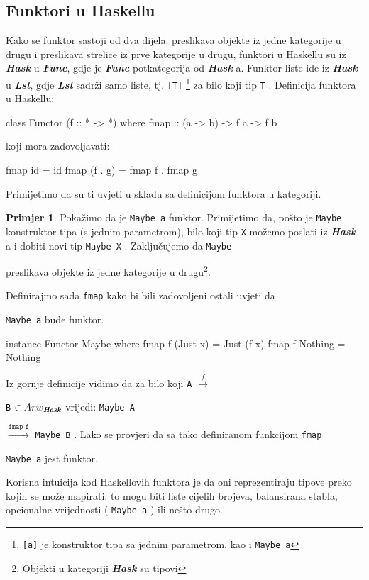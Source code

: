 \documentclass[11pt]{article}
\newcommand{\category}[1]{\textbf{\emph{#1}}}
\newcommand{\codei}[1]{
  {\lstinline[basicstyle=\ttfamily]{#1}}
}
\theoremstyle{definition}
\newtheorem{primjer}{Primjer}
\begin{document}
  \subsection{Funktori u Haskellu}
  Kako se funktor sastoji od dva dijela: preslikava objekte iz jedne kategorije u drugu
  i preslikava strelice iz prve kategorije u drugu, funktori u Haskellu su iz
  \category{Hask} u \category{Func}, gdje je \category{Func} potkategorija od
  \category{Hask}-a. Funktor liste ide iz \category{Hask} u \category{Lst},
  gdje \category{Lst} sadrži samo liste, tj.\codei{[T]}\footnote{
    \codei{[a]} je konstruktor tipa sa jednim parametrom,
    kao i \codei{Maybe a}}
  za bilo koji tip \codei{T}. Definicija funktora u Haskellu:
  \begin{mcode}
    class Functor (f :: * -> *) where
      fmap :: (a -> b) -> f a -> f b
  \end{mcode}
  koji mora zadovoljavati:
  \begin{mcode}
    fmap id = id
    fmap (f . g) = fmap f . fmap g
  \end{mcode}
  Primijetimo da su ti uvjeti u skladu sa definicijom funktora u kategoriji.
  \begin{primjer}
    Pokažimo da je \codei{Maybe a} funktor.
    Primijetimo da, pošto je \codei{Maybe} konstruktor tipa (s jednim
    parametrom), bilo koji tip \codei{X} možemo poslati iz \category{Hask}-a i
    dobiti novi tip \codei{Maybe X}. Zaključujemo da \codei{Maybe}
    preslikava objekte iz jedne kategorije u drugu\footnote{Objekti u
      kategoriji \category{Hask} su tipovi}.

    Definirajmo sada \codei{fmap} kako bi bili zadovoljeni ostali uvjeti da
    \codei{Maybe a} bude funktor.
    \begin{mcode}
      instance Functor Maybe where
        fmap f (Just x) = Just (f x)
        fmap f Nothing = Nothing
    \end{mcode}
    Iz gornje definicije vidimo da za bilo koji \codei{A} $\xrightarrow{f}$
    \codei{B} $\in
    Arw_\category{Hask}$ vrijedi: \codei{Maybe A}
    $\xrightarrow{\texttt{fmap f}}$ \codei{Maybe B}.
    Lako se provjeri da sa tako definiranom funkcijom \codei{fmap} 
    \codei{Maybe a} jest funktor.
  \end{primjer}
  Korisna intuicija kod Haskellovih funktora je da oni reprezentiraju tipove
  preko kojih se može mapirati: to mogu biti liste cijelih brojeva,
  balansirana stabla, opcionalne vrijednosti (\codei{Maybe a}) ili nešto drugo.
\end{document}
